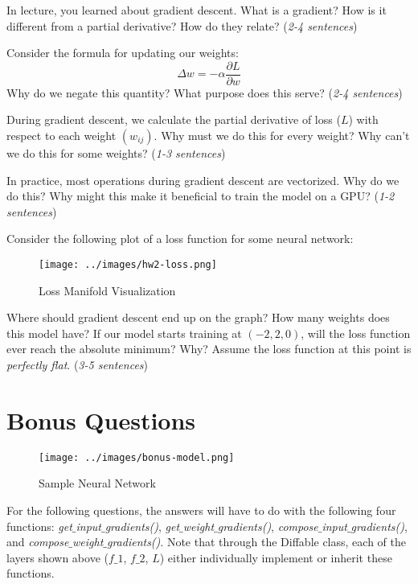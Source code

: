 \documentclass[11pt, answers]{exam}
\begin{document}
\begin{questions}
	\question
	In lecture, you learned about gradient descent. What is a gradient? How is it different from a partial derivative? How do they relate? ({\it 2-4 sentences})

	\question
	Consider the formula for updating our weights:
	$$\Delta w = -\alpha \frac{\partial L}{\partial w}$$
	Why do we negate this quantity? What purpose does this serve? ({\it 2-4 sentences})

	\question
	During gradient descent, we calculate the partial derivative of loss ($L$) with respect to each weight $(w_{ij})$. Why must we do this for every weight? Why can't we do this for some weights? ({\it 1-3 sentences})

	\question
	In practice, most operations during gradient descent are vectorized. Why do we do this? Why might this make it beneficial to train the model on a GPU? ({\it 1-2 sentences})

	\question
	Consider the following plot of a loss function for some neural network:
	\begin{figure}[H]
		\caption{Loss Manifold Visualization}
		\centering
		\texttt{[image: ../images/hw2-loss.png]}
		\label{fig:label}
	\end{figure}
	Where should gradient descent end up on the graph? How many weights does this model have? If our model starts training at $(-2, 2, 0)$, will the loss function ever reach the absolute minimum? Why? Assume the loss function at this point is {\it perfectly flat}. ({\it 3-5 sentences})

\end{questions}

\newpage %

\section{Bonus Questions}

\begin{figure}[H]
	\caption{Sample Neural Network}
	\centering
	\texttt{[image: ../images/bonus-model.png]}
	\label{fig:label}
\end{figure}

For the following questions, the answers will have to do with the following four functions: \textit{get$\_$input$\_$gradients()}, \textit{get$\_$weight$\_$gradients()}, \textit{compose$\_$input$\_$gradients()}, and \textit{compose$\_$weight$\_$gradients()}. Note that through the Diffable class, each of the layers shown above ($f\_1$, $f\_2$, $L$)  either individually  implement or inherit these functions.
\end{document}

